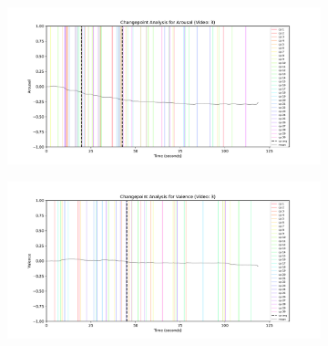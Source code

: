 \documentclass[11pt, letterpaper]{article}
\begin{document}
\begin{figure}
        \centering
    \begin{subfigure}[t]{0.49\textwidth}
        \centering
        \includegraphics[width=\linewidth]{changepoints_V3_arousal_avg} 
        \caption{} \label{fig:changepoints_V3_arousal_avg}
    \end{subfigure}
    \hfill
    \begin{subfigure}[t]{0.49\textwidth}
        \centering
        \includegraphics[width=\linewidth]{changepoints_V3_valence_avg} 
        \caption{} \label{fig:changepoints_V3_valence_avg}
    \end{subfigure}

    \vspace{1cm}
    

\end{figure}
\end{document}
